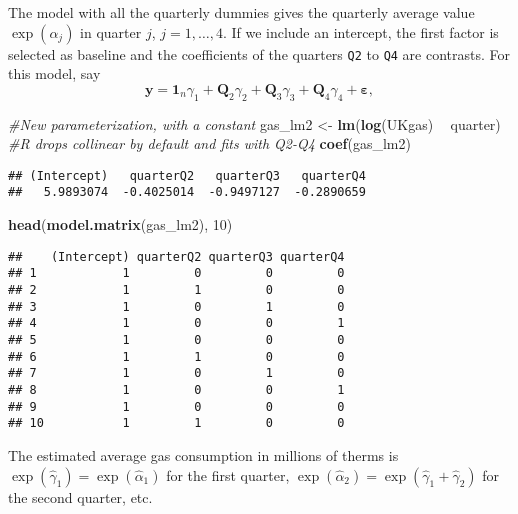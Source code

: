 \documentclass[]{book}
\newenvironment{Shaded}{\begin{snugshade}}{\end{snugshade}}
\newcommand{\CommentTok}[1]{\textcolor[rgb]{0.56,0.35,0.01}{\textit{#1}}}
\newcommand{\DecValTok}[1]{\textcolor[rgb]{0.00,0.00,0.81}{#1}}
\newcommand{\KeywordTok}[1]{\textcolor[rgb]{0.13,0.29,0.53}{\textbf{#1}}}
\newcommand{\NormalTok}[1]{#1}
\newcommand{\OperatorTok}[1]{\textcolor[rgb]{0.81,0.36,0.00}{\textbf{#1}}}
\newcommand{\StringTok}[1]{\textcolor[rgb]{0.31,0.60,0.02}{#1}}
\theoremstyle{definition}
\theoremstyle{definition}
\theoremstyle{definition}
\theoremstyle{remark}
\begin{document}
The model with all the quarterly dummies gives the quarterly average value \(\exp(\alpha_j)\) in quarter \(j\), \(j = 1, \ldots, 4\).
If we include an intercept, the first factor is selected as baseline and the coefficients of the quarters \texttt{Q2} to \texttt{Q4} are contrasts.
For this model, say
\[ \boldsymbol{y} = \mathbf{1}_n \gamma_1 + \mathbf{Q}_2 \gamma_2 + \mathbf{Q}_3 \gamma_3 + \mathbf{Q}_4 \gamma_4 + \boldsymbol{\varepsilon},
\]

\begin{Shaded}
\begin{Highlighting}[]
\CommentTok{#New parameterization, with a constant}
\NormalTok{gas_lm2 <-}\StringTok{ }\KeywordTok{lm}\NormalTok{(}\KeywordTok{log}\NormalTok{(UKgas) }\OperatorTok{~}\StringTok{ }\NormalTok{quarter) }\CommentTok{#R drops collinear by default and fits with Q2-Q4}
\KeywordTok{coef}\NormalTok{(gas_lm2)}
\end{Highlighting}
\end{Shaded}

\begin{verbatim}
## (Intercept)   quarterQ2   quarterQ3   quarterQ4 
##   5.9893074  -0.4025014  -0.9497127  -0.2890659
\end{verbatim}

\begin{Shaded}
\begin{Highlighting}[]
\KeywordTok{head}\NormalTok{(}\KeywordTok{model.matrix}\NormalTok{(gas_lm2), }\DecValTok{10}\NormalTok{)}
\end{Highlighting}
\end{Shaded}

\begin{verbatim}
##    (Intercept) quarterQ2 quarterQ3 quarterQ4
## 1            1         0         0         0
## 2            1         1         0         0
## 3            1         0         1         0
## 4            1         0         0         1
## 5            1         0         0         0
## 6            1         1         0         0
## 7            1         0         1         0
## 8            1         0         0         1
## 9            1         0         0         0
## 10           1         1         0         0
\end{verbatim}

The estimated average gas consumption in millions of therms is \(\exp(\widehat{\gamma}_1)=\exp(\widehat{\alpha}_1)\) for the first quarter, \(\exp(\widehat{\alpha}_2)=\exp(\widehat{\gamma}_1+\widehat{\gamma}_2)\) for the second quarter, etc.
\end{document}
